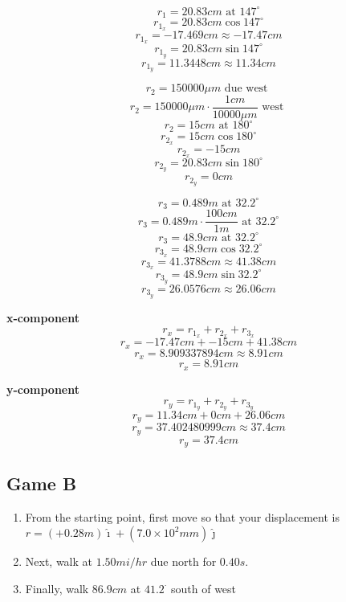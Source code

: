 \documentclass[11pt, letterpaper, includehead]{article}
\begin{document}
\begin{multicols}{3}
  $$r_1 = 20.83cm\text{ at }147^{\circ}$$
  $$r_{1_x} = 20.83cm\cos147^{\circ}$$
  $$r_{1_x} = -17.469cm \approx -17.47cm$$
  $$r_{1_y} = 20.83cm\sin147^{\circ}$$
  $$r_{1_y} = 11.3448cm \approx 11.34cm$$
  \columnbreak

  $$r_2 = 150000\mu m\text{ due west }$$
  $$r_2 = 150000\mu m\cdot\frac{1cm}{10000\mu m}\text{ west }$$
  $$r_2 = 15cm\text{ at }180^{\circ}$$
  $$r_{2_x} = 15cm\cos180^{\circ}$$
  $$r_{2_x} = -15cm$$
  $$r_{2_y} = 20.83cm\sin180^{\circ}$$
  $$r_{2_y} = 0cm$$

  \columnbreak
  $$r_3 = 0.489m\text{ at }32.2^{\circ}$$
  $$r_3 = 0.489m\cdot\frac{100cm}{1m}\text{ at }32.2^{\circ}$$
  $$r_3 = 48.9cm\text{ at }32.2^{\circ}$$
  $$r_{3_x} = 48.9cm\cos32.2^{\circ}$$
  $$r_{3_x} = 41.3788cm \approx 41.38cm$$
  $$r_{3_y} = 48.9cm\sin32.2^{\circ}$$
  $$r_{3_y} = 26.0576cm \approx 26.06cm$$

\end{multicols}

\hspace{0.5cm}

\begin{multicols}{2}
  \centering\textbf{x-component}
  $$r_x = r_{1_x} + r_{2_x} + r_{3_x}$$
  $$r_x = -17.47cm + -15cm + 41.38cm$$
  $$r_x = 8.909337894cm \approx{8.91cm}$$
  $$\boxed{r_x = {8.91cm}}$$

  \columnbreak
  \centering\textbf{y-component}
  $$r_y = r_{1_y} + r_{2_y} + r_{3_y}$$
  $$r_y = 11.34cm +  0cm + 26.06cm$$
  $$r_y = 37.402480999cm \approx 37.4cm$$
  $$\boxed{r_y = 37.4cm}$$
  
\end{multicols}

\subsection{Game B} %
\begin{enumerate}
  \item From the starting point, first move so that your displacement is
  \\ $r = (+0.28m)\hat\imath+(7.0 \times 10^2mm)\hat\jmath$
  \item Next, walk at $1.50 mi/hr$ due north for $ 0.40 s$.
  \item Finally, walk $86.9 cm$ at $41.2^{\cdot}$ south of west
\end{enumerate}
\end{document}
